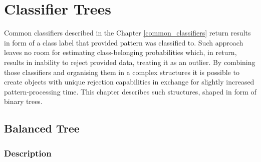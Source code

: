 \chapter{Classifier Trees}

Common classifiers described in the Chapter \ref{common_classifiers} return results in form of a class label that provided pattern was classified to. Such approach leaves no room for estimating class-belonging probabilities which, in return, results in inability to reject provided data, treating it as an outlier. By combining those classifiers and organising them in a complex structures it is possible to create objects with unique rejection capabilities in exchange for slightly increased pattern-processing time. This chapter describes such structures, shaped in form of binary trees.

\section{Balanced Tree}

\subsection{Description}

